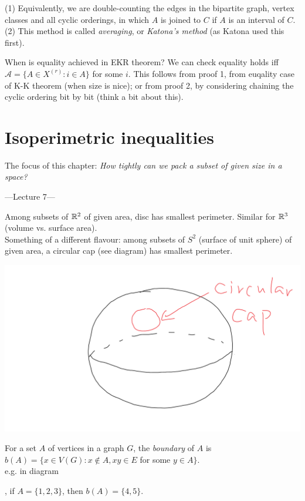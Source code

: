 \documentclass[a4paper]{article}
\begin{document}
\begin{thm}
    \begin{rem}
        (1) Equivalently, we are double-counting the edges in the bipartite graph, vertex classes and all cyclic orderings, in which $A$ is joined to $C$ if $A$ is an interval of $C$.\\
        (2) This method is called \emph{averaging}, or \emph{Katona's method} (as Katona used this first).
    \end{rem}
\end{thm}

When is equality achieved in EKR theorem? We can check equality holds iff $\mathcal{A} = \{A \in X^{(r)}: i \in A\}$ for some $i$. This follows from proof 1, from euqality case of K-K theorem (when size is nice); or from proof 2, by considering chaining the cyclic ordering bit by bit (think a bit about this).

\newpage

\section{Isoperimetric inequalities}
The focus of this chapter: \emph{How tightly can we pack a subset of given size in a space?}

---Lecture 7---

Among subsets of $\mathbb{R}^2$ of given area, disc has smallest perimeter. Similar for $\mathbb{R}^3$ (volume vs. surface area).\\
Something of a different flavour: among subsets of $S^2$ (surface of unit sphere) of given area, a circular cap (see diagram) has smallest perimeter.

\includegraphics[scale=0.5]{image/Comb_01.png}

For a set $A$ of vertices in a graph $G$, the \emph{boundary} of $A$ is $b(A) = \{x\in V(G): x \not\in A, xy \in E$ for some $y \in A\}$.\\
e.g. in diagram
, if $A = \{1,2,3\}$, then $b(A) = \{4,5\}$.
\end{document}
